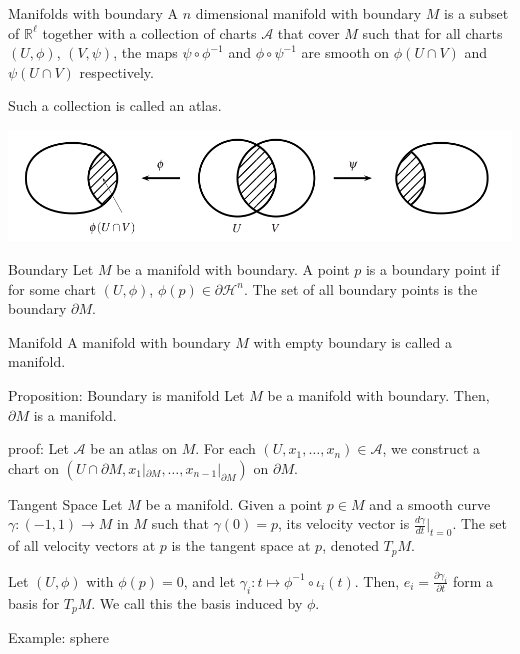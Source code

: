 \documentclass[9pt]{beamer}
\begin{document}
\begin{frame}
    \begin{block}{Manifolds with boundary}
        A $n$ dimensional manifold with boundary $M$ is a subset of $\mathbb{R}^\ell$ together with a collection of charts $\mathcal{A}$ that cover $M$ such that for all charts $(U, \phi)$, $(V, \psi)$, the maps $\psi\circ\phi^{-1}$ and $\phi\circ\psi^{-1}$ are smooth on $\phi(U\cap V)$ and $\psi(U\cap V)$ respectively.

        Such a collection is called an atlas.
    \end{block}
    \includegraphics[scale=0.55]{compatible.PNG}

\end{frame}

\begin{frame}{}
    \begin{block}{Boundary}
        Let $M$ be a manifold with boundary. A point $p$ is a boundary point if for some chart $(U, \phi)$, $\phi(p)\in \partial \mathcal{H}^n$. The set of all boundary points is the boundary $\partial M$.
    \end{block}

    \begin{block}{Manifold}
        A manifold with boundary $M$ with empty boundary is called a manifold. 
    \end{block}

    \begin{block}{Proposition: Boundary is manifold}
        Let $M$ be a manifold with boundary. Then, $\partial M$ is a manifold.
    \end{block}
    proof: Let $\mathcal{A}$ be an atlas on $M$. For each $(U, x_1, \dots, x_n)\in \mathcal{A}$, we construct a chart on $(U\cap \partial M , x_1|_{\partial M}, \dots, x_{n-1}|_{\partial M})$ on $\partial M$.
\end{frame}

\begin{frame}
    \begin{block}{Tangent Space}
        Let $M$ be a manifold. Given a point $p\in M$ and a smooth curve $\gamma:(-1,1)\rightarrow M$ in $M$ such that $\gamma(0)=p$, its velocity vector is $\frac{d\gamma}{dt}\vert_{t=0}$. The set of all velocity vectors at $p$ is the tangent space at $p$, denoted $T_p M$.
    \end{block}
    Let $(U, \phi)$ with $\phi(p)=0$, and let $\gamma_i:t\mapsto \phi^{-1}\circ\iota_i(t)$. Then, $e_i=\frac{\partial \gamma_i}{\partial t}$ form a basis for $T_pM$. We call this the basis induced by $\phi$.

    Example: sphere
\end{frame}
\end{document}
